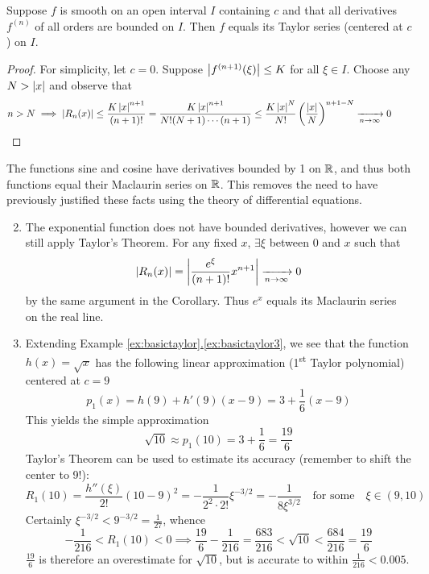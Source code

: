 \begin{cor}{}{}
Suppose $f$ is smooth on an open interval $I$ containing $c$ and that all derivatives $f^{(n)}$ of all orders are bounded on $I$. Then $f$ equals its Taylor series (centered at $c$) on $I$.
\end{cor}

\begin{proof}
For simplicity, let $c=0$. Suppose $\left| f^{(n+1)}(\xi)\right|\le K$ for all $\xi\in I$. Choose any $N>\left| x\right|$ and observe that
\[n>N\implies\left| R_n(x)\right|\le\frac{K\left| x\right|^{n+1}}{(n+1)!} = \frac{K\left| x\right|^{n+1}}{N!(N+1)\cdots(n+1)} \le \frac{K\left| x\right|^{N}}{N!}\left(\frac{\left| x\right|}{N}\right)^{n+1-N}\xrightarrow[n\to\infty]{} 0\tag*{\qedhere}\]
\end{proof}

\goodbreak

\begin{examples}{}{}
\exstart The functions sine and cosine have derivatives bounded by 1 on $\mathbb{R}$, and thus both functions equal their Maclaurin series on $\mathbb{R}$. This removes the need to have previously justified these facts using the theory of differential equations.
\begin{enumerate}\setcounter{enumi}{1}
	\item The exponential function does not have bounded derivatives, however we can still apply Taylor's Theorem. For any fixed $x$, $\exists\xi$ between $0$ and $x$ such that
	\[\left| R_n(x)\right|=\left| \frac{e^\xi}{(n+1)!}x^{n+1}\right|\xrightarrow[n\to\infty]{} 0\]
	by the same argument in the Corollary. Thus $e^x$ equals its Maclaurin series on the real line.
	\item Extending Example \hyperref[ex:basictaylor3]{\ref*{ex:basictaylor}.\ref*{ex:basictaylor3}}, we see that the function $h(x)=\sqrt x$ has the following linear approximation (1\textsuperscript{st} Taylor polynomial) centered at $c=9$
	\[p_1(x)=h(9)+h'(9)(x-9)=3+\frac 16(x-9)\]
	This yields the simple approximation
	\[\sqrt{10}\approx p_1(10)= 3+\frac 16=\frac{19}6\]
	Taylor's Theorem can be used to estimate its accuracy (remember to shift the center to 9!):
	\[R_1(10)=\frac{h''(\xi)}{2!}(10-9)^2= -\frac{1}{2^2\cdot 2!}\xi^{-3/2} =-\frac 1{8\xi^{3/2}}\quad\text{for some}\quad \xi\in(9,10)\]
	Certainly $\xi^{-3/2}<9^{-3/2}=\frac 1{27}$, whence
	\[-\frac 1{216}<R_1(10)<0\implies \frac{19}6-\frac 1{216}=\frac{683}{216}<\sqrt{10}<\frac{684}{216}=\frac{19}6\]
	$\frac{19}6$ is therefore an overestimate for $\sqrt{10}$, but is accurate to within $\frac 1{216}<0.005$.
\end{enumerate}
\end{examples}

